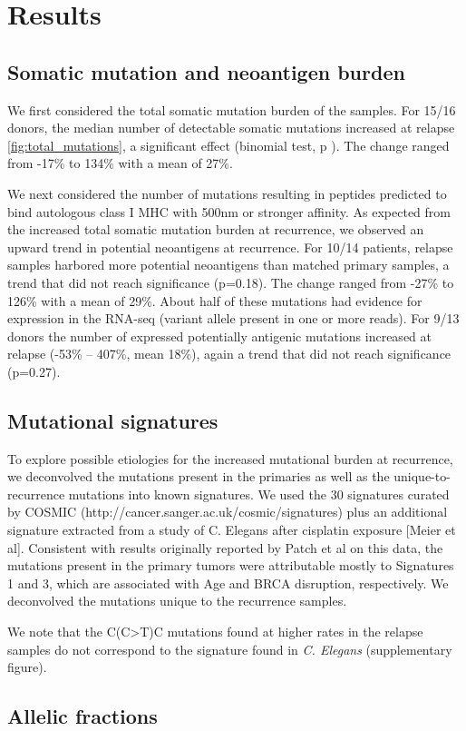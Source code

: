 \section*{Results}
\subsection*{Somatic mutation and neoantigen burden}

We first considered the total somatic mutation burden of the samples. For 15/16 donors, the median number of detectable somatic mutations increased at relapse \ref{fig:total_mutations}, a significant effect (binomial test, p ). The change ranged from -17\% to 134\% with a mean of 27\%.

We next considered the number of mutations resulting in peptides predicted to bind autologous class I MHC with 500nm or stronger affinity. As expected from the increased total somatic mutation burden at recurrence, we observed an upward trend in potential neoantigens at recurrence. For 10/14 patients, relapse samples harbored more potential neoantigens than matched primary samples, a trend that did not reach significance (p=0.18). The change ranged from -27\% to 126\% with a mean of 29\%. About half of these mutations had evidence for expression in the RNA-seq (variant allele present in one or more reads). For 9/13 donors the number of expressed potentially antigenic mutations increased at relapse (-53\% -- 407\%, mean 18\%), again a trend that did not reach significance (p=0.27).


\subsection*{Mutational signatures}
To explore possible etiologies for the increased mutational burden at recurrence, we deconvolved the mutations present in the primaries as well as the unique-to-recurrence mutations into known signatures. We used the 30 signatures curated by COSMIC (http://cancer.sanger.ac.uk/cosmic/signatures) plus an additional signature extracted from a study of C. Elegans after cisplatin exposure [Meier et al]. Consistent with results originally reported by Patch et al on this data, the mutations present in the primary tumors were attributable mostly to Signatures 1 and 3, which are associated with Age and BRCA disruption, respectively. We deconvolved the mutations unique to the recurrence samples. 

We note that the C(C>T)C mutations found at higher rates in the relapse samples do not correspond to the signature found in \textit{C. Elegans} (supplementary figure).

\subsection*{Allelic fractions}



